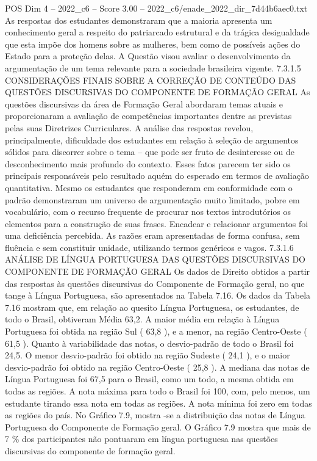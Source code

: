 \begin{textsample}{POS Dim 4 – 2022\_c6 – Score 3.00 – 2022\_c6/enade\_2022\_dir\_7d44b6aec0.txt}
As respostas dos estudantes demonstraram que a maioria apresenta um conhecimento geral a respeito do patriarcado estrutural e da trágica desigualdade que esta impõe dos homens sobre as mulheres, bem como de possíveis ações do Estado para a proteção delas.
A Questão visou avaliar o desenvolvimento da argumentação de um tema relevante para a sociedade brasileira vigente. 7.3.1.5 CONSIDERAÇÕES FINAIS SOBRE A CORREÇÃO DE CONTEÚDO DAS QUESTÕES DISCURSIVAS DO COMPONENTE DE FORMAÇÃO GERAL As questões discursivas da área de Formação Geral abordaram temas atuais e proporcionaram a avaliação de competências importantes dentre as previstas pelas suas Diretrizes Curriculares.
A análise das respostas revelou, principalmente, dificuldade dos estudantes em relação à seleção de argumentos sólidos para discorrer sobre o tema – que pode ser fruto de desinteresse ou de desconhecimento mais profundo do contexto.
Esses fatos parecem ter sido os principais responsáveis pelo resultado aquém do esperado em termos de avaliação quantitativa.
Mesmo os estudantes que responderam em conformidade com o padrão demonstraram um universo de argumentação muito limitado, pobre em vocabulário, com o recurso frequente de procurar nos textos introdutórios os elementos para a construção de suas frases.
Encadear e relacionar argumentos foi uma deficiência percebida.
As razões eram apresentadas de forma confusa, sem fluência e sem constituir unidade, utilizando termos genéricos e vagos. 7.3.1.6 ANÁLISE DE LÍNGUA PORTUGUESA DAS QUESTÕES DISCURSIVAS DO COMPONENTE DE FORMAÇÃO GERAL Os dados de Direito obtidos a partir das respostas às questões discursivas do Componente de Formação geral, no que tange à Língua Portuguesa, são apresentados na Tabela 7.16.
Os dados da Tabela 7.16 mostram que, em relação ao quesito Língua Portuguesa, os estudantes, de todo o Brasil, obtiveram Média 63,2.
A maior média em relação à Língua Portuguesa foi obtida na região Sul ( 63,8 ), e a menor, na região Centro-Oeste ( 61,5 ).
Quanto à variabilidade das notas, o desvio-padrão de todo o Brasil foi 24,5.
O menor desvio-padrão foi obtido na região Sudeste ( 24,1 ), e o maior desvio-padrão foi obtido na região Centro-Oeste ( 25,8 ).
A mediana das notas de Língua Portuguesa foi 67,5 para o Brasil, como um todo, a mesma obtida em todas as regiões.
A nota máxima para todo o Brasil foi 100, com, pelo menos, um estudante tirando essa nota em todas as regiões.
A nota mínima foi zero em todas as regiões do país.
No Gráfico 7.9, mostra -se a distribuição das notas de Língua Portuguesa do Componente de Formação geral.
O Gráfico 7.9 mostra que mais de 7 \% dos participantes não pontuaram em língua portuguesa nas questões discursivas do componente de formação geral.

\end{textsample}
